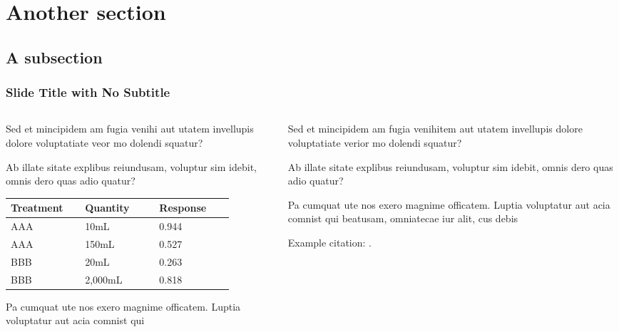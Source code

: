 \documentclass[
	aspectratio=169, %
	t, %
	onlytextwidth, %
	10pt, %
]{beamer}
\begin{document}

\section{Another section}

\subsection{A subsection}

\begin{frame}
	\frametitle{Slide Title with No Subtitle}
	
	\begin{columns}[T] %
		\begin{column}{0.48\linewidth} %
			Sed et mincipidem am fugia venihi aut utatem invellupis dolore voluptatiate veor mo dolendi squatur?

			Ab illate sitate explibus reiundusam, voluptur sim idebit, omnis dero quas adio quatur?
			
			\begin{tabular}{L{0.28\linewidth} C{0.28\linewidth} R{0.28\linewidth}}
				\toprule
				Treatment & Quantity & Response\\
				\midrule
				AAA & 10mL & 0.944\\
				AAA & 150mL & 0.527\\
				BBB & 20mL & 0.263\\
				BBB & 2,000mL & 0.818\\
				\bottomrule
			\end{tabular}
			
			Pa cumquat ute nos exero magnime officatem. Luptia voluptatur aut acia comnist qui
		\end{column}
		\begin{column}{0.48\linewidth} %
			Sed et mincipidem am fugia venihitem aut utatem invellupis dolore voluptatiate verior mo dolendi squatur?

			Ab illate sitate explibus reiundusam, voluptur sim idebit, omnis dero quas adio quatur?

			Pa cumquat ute nos exero magnime officatem. Luptia voluptatur aut acia comnist qui beatusam, omniatecae iur alit, cus debis

            Example citation: \cite{ekman_universals_1971}.
		\end{column}
	\end{columns}
\end{frame}
\end{document}
